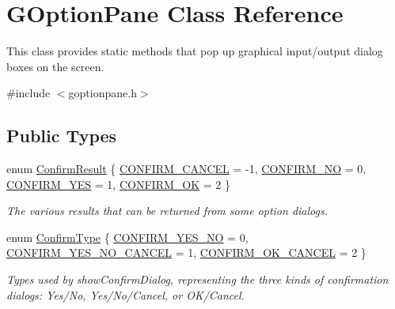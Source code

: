 \hypertarget{classGOptionPane}{}\section{G\+Option\+Pane Class Reference}
\label{classGOptionPane}


This class provides static methods that pop up graphical input/output dialog boxes on the screen.  




{\ttfamily \#include $<$goptionpane.\+h$>$}

\subsection*{Public Types}
\begin{DoxyCompactItemize}
\item 
enum \mbox{\hyperlink{classGOptionPane_a1cc9e8685029e39646671ed71f32d47d}{Confirm\+Result}} \{ \mbox{\hyperlink{classGOptionPane_a1cc9e8685029e39646671ed71f32d47dacd3ba58104ba5a343e0f2fc2839c9202}{C\+O\+N\+F\+I\+R\+M\+\_\+\+C\+A\+N\+C\+EL}} = -\/1, 
\mbox{\hyperlink{classGOptionPane_a1cc9e8685029e39646671ed71f32d47dafec070235546c9e3ceb562e6e1a0c24e}{C\+O\+N\+F\+I\+R\+M\+\_\+\+NO}} = 0, 
\mbox{\hyperlink{classGOptionPane_a1cc9e8685029e39646671ed71f32d47da090492ce2b803840f3c07f6f56116ba3}{C\+O\+N\+F\+I\+R\+M\+\_\+\+Y\+ES}} = 1, 
\mbox{\hyperlink{classGOptionPane_a1cc9e8685029e39646671ed71f32d47dacd7dbef45f6bf553d72a78e7f5389b4c}{C\+O\+N\+F\+I\+R\+M\+\_\+\+OK}} = 2
 \}
\begin{DoxyCompactList}\small\item\em The various results that can be returned from some option dialogs. \end{DoxyCompactList}\item 
enum \mbox{\hyperlink{classGOptionPane_a6a1aaf19c06f5a6bef89ea6415547049}{Confirm\+Type}} \{ \mbox{\hyperlink{classGOptionPane_a6a1aaf19c06f5a6bef89ea6415547049a964914d27eb73a202938a53f43adc4b1}{C\+O\+N\+F\+I\+R\+M\+\_\+\+Y\+E\+S\+\_\+\+NO}} = 0, 
\mbox{\hyperlink{classGOptionPane_a6a1aaf19c06f5a6bef89ea6415547049a534f72dad7322c4a590adef3fccb8745}{C\+O\+N\+F\+I\+R\+M\+\_\+\+Y\+E\+S\+\_\+\+N\+O\+\_\+\+C\+A\+N\+C\+EL}} = 1, 
\mbox{\hyperlink{classGOptionPane_a6a1aaf19c06f5a6bef89ea6415547049a8c54c3531625688e49c049e608197afb}{C\+O\+N\+F\+I\+R\+M\+\_\+\+O\+K\+\_\+\+C\+A\+N\+C\+EL}} = 2
 \}
\begin{DoxyCompactList}\small\item\em Types used by show\+Confirm\+Dialog, representing the three kinds of confirmation dialogs\+: Yes/\+No, Yes/\+No/\+Cancel, or O\+K/\+Cancel. \end{DoxyCompactList}\item 

\end{DoxyCompactItemize}
